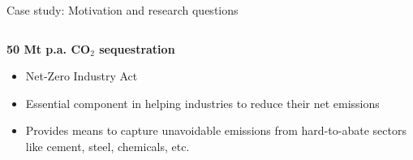 \documentclass[10pt,aspectratio=169,dvipsnames]{beamer}
\begin{document}
\begin{frame}{Case study: Motivation and research questions}
\begin{columns}[T]
    \begin{column}{.3\textwidth}
        \begin{minipage}[t][.45\textheight]{\linewidth}
            \begin{exampleblock}{\textbf{50 Mt p.a. CO$_2$ sequestration}}
                \begin{itemize}
                  \item \alert{Net-Zero Industry Act}
                  \item Essential component in helping industries to reduce their net emissions
                  \item Provides means to capture unavoidable emissions from hard-to-abate sectors like cement, steel, chemicals, etc.
                \end{itemize}
            \end{exampleblock}
        \end{minipage}
    \end{column}
  \end{columns}

  \vspace{1.3cm}

\end{frame}
\end{document}
